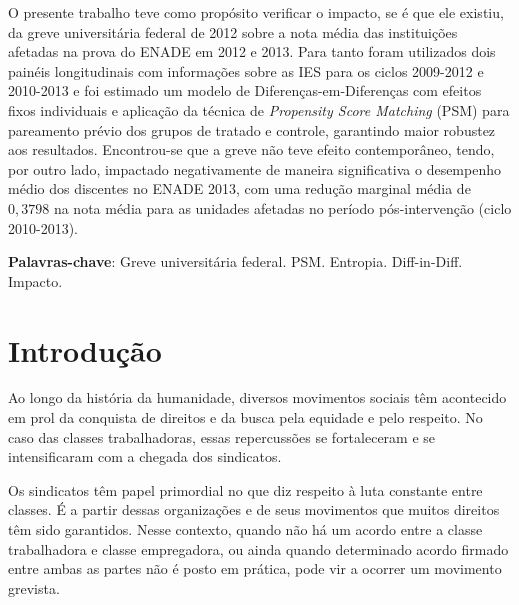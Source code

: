 

\newcommand\disciplina{Avaliação de Políticas Públicas}
\newcommand\professor{Aléssio Tony C. Almeida}







\begin{resumo}

O presente trabalho teve como propósito verificar o impacto, se é que ele existiu, da greve universitária federal de 2012 sobre a nota média das instituições afetadas na prova do ENADE em 2012 e 2013. Para tanto foram utilizados dois painéis longitudinais com informações sobre as IES para os ciclos 2009-2012 e 2010-2013 e foi estimado um modelo de Diferenças-em-Diferenças com efeitos fixos individuais e aplicação da técnica de \textit{Propensity Score Matching} (PSM) para pareamento prévio dos grupos de tratado e controle, garantindo maior robustez aos resultados. Encontrou-se que a greve não teve efeito contemporâneo, tendo, por outro lado, impactado negativamente de maneira significativa o desempenho médio dos discentes no ENADE 2013, com uma redução marginal média de $0,3798$ na nota média para as unidades afetadas no período pós-intervenção (ciclo 2010-2013).

\textbf{Palavras-chave}: Greve universitária federal. PSM. Entropia.  Diff-in-Diff. Impacto.
\end{resumo} 

\textual
{}

\chapter{Introdução}

Ao longo da história da humanidade, diversos movimentos sociais têm acontecido em prol da conquista de direitos e da busca pela equidade e pelo respeito. No caso das classes trabalhadoras, essas repercussões se fortaleceram e se intensificaram com a chegada dos sindicatos.

Os sindicatos têm papel primordial no que diz respeito à luta constante entre classes. É a partir dessas organizações e de seus movimentos que muitos direitos têm sido garantidos. Nesse contexto, quando não há um acordo entre a classe trabalhadora e classe empregadora, ou ainda quando determinado acordo firmado entre ambas as partes não é posto em prática, pode vir a ocorrer um movimento grevista.

